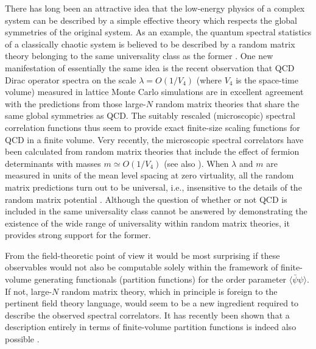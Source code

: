 \narrowtext
There has long been an attractive idea that 
the low-energy physics of a complex system can be
described by a simple effective theory which respects the
global symmetries of the original system.
As an example, the quantum spectral statistics of a classically chaotic system 
is believed to be described 
by a random matrix theory belonging to the same universality class
as the former \cite{BGS}.
One new manifestation of essentially the same idea is the recent observation
that QCD Dirac operator spectra on the scale
$\lambda=O(1/V_4)$ (where $V_4$ is the space-time volume) 
measured in lattice Monte Carlo simulations \cite{BBMSVW}
are in excellent agreement with the predictions
from those large-$N$ random matrix theories \cite{V,ADMN} that
share the same global symmetries as QCD. 
The suitably rescaled (microscopic) spectral correlation functions thus 
seem to provide exact finite-size scaling functions for QCD in a
finite volume. 
Very recently, the microscopic
spectral correlators have been calculated from random matrix theories
that include the effect of fermion determinants with masses 
$m \simeq O(1/V_4)$ \cite{DN1,DN2,WGW} (see also \cite{JNZ}).
When $\lambda$ and $m$ are measured in units of
the mean level spacing at zero virtuality,
all the random matrix predictions turn out to be universal, 
i.e., insensitive to the
details of the random matrix potential \cite{ADMN,DN1,DN2}.
Although the question of whether or not QCD is included in the
same universality class cannot be answered by
demonstrating the existence of the wide range of universality within random 
matrix theories, it provides strong support for the former.

{}From the field-theoretic point of view \cite{LS} it would be most 
surprising if these observables would not also be computable solely
within the framework of finite-volume generating functionals (partition
functions) for the order parameter $\langle\bar{\psi}\psi\rangle$. 
If not, large-$N$ 
random matrix theory, which in principle is foreign to the pertinent
field theory language, would seem to be a new ingredient required to
describe the observed spectral correlators. It has recently been shown
that a description entirely in terms of finite-volume partition functions
is indeed also possible \cite{D1}. 

